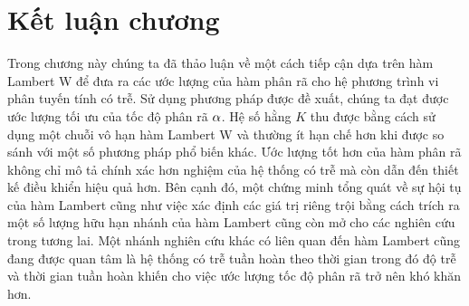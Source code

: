 \section{Kết luận chương}
Trong chương này chúng ta đã thảo luận về một cách tiếp cận dựa trên hàm Lambert W để đưa ra các ước lượng của hàm phân rã cho hệ phương trình vi phân tuyến tính có trễ. 
Sử dụng phương pháp được đề xuất, chúng ta đạt được ước lượng tối ưu của tốc độ phân rã $\alpha$. Hệ số hằng $K$ thu được bằng cách sử dụng một chuỗi vô hạn hàm Lambert W và thường ít hạn chế hơn khi được so sánh với một số phương pháp phổ biến khác. Ước lượng tốt hơn của hàm phân rã không chỉ mô tả chính xác hơn nghiệm của hệ thống có trễ mà còn dẫn đến thiết kế điều khiển hiệu quả hơn. Bên cạnh đó, một chứng minh tổng quát 
về sự hội tụ của hàm Lambert cũng như việc xác định các giá trị riêng trội bằng cách trích ra một số lượng hữu hạn nhánh của hàm Lambert cũng còn mở cho các nghiên cứu trong tương lai. 
Một nhánh nghiên cứu khác có liên quan đến hàm Lambert cũng đang được quan tâm là hệ thống có trễ tuần hoàn theo thời gian %
trong đó độ trễ và thời gian tuần hoàn khiến cho việc ước lượng tốc độ phân rã trở nên khó khăn hơn. 






